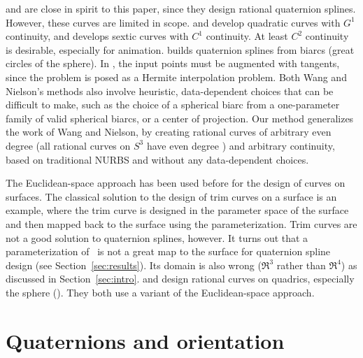 \cite{wang93, wang94} and \cite{nielson93} are close in spirit 
to this paper, since they design rational quaternion splines.
However, these curves are limited in scope.
\cite{wang93,wang94} and \cite{nielson93} develop quadratic curves
with $G^1$ continuity, and \cite{wang94} develops sextic curves
with $C^1$ continuity.
At least $C^2$ continuity is desirable, especially for animation.
\cite{wang93} builds quaternion splines from biarcs 
(great circles of the sphere).
In \cite{wang93,wang94}, the input points must be augmented with 
tangents, since the problem is posed as a Hermite interpolation problem.
Both Wang and Nielson's methods also involve heuristic, data-dependent choices
that can be difficult to make,
such as the choice of a spherical biarc from
a one-parameter family of valid spherical biarcs, or a center of projection.
Our method generalizes the work of Wang and Nielson, 
by creating rational curves of arbitrary even degree 
(all rational curves on $S^3$ have even degree \cite{wang94}) 
and arbitrary continuity,
based on traditional NURBS and without any data-dependent choices.

The Euclidean-space approach has been used before
for the design of curves on surfaces.
The classical solution to the design of trim curves on a surface 
is an example, where the trim curve is designed in the parameter space 
of the surface and then mapped back to the surface using the
parameterization. %
Trim curves are not a good solution to quaternion splines, however.
It turns out that a parameterization of \ is not a great map
to the surface for quaternion spline design (see Section~\ref{sec:results}).
Its domain is also wrong ($\Re^3$ rather than $\Re^4$) as discussed
in Section~\ref{sec:intro}.
\cite{dietz93} and \cite{wang94} design rational curves on quadrics,
especially the sphere ().
They both use a variant of the Euclidean-space approach.

\section{Quaternions and orientation}
\label{sec:quaternion}

